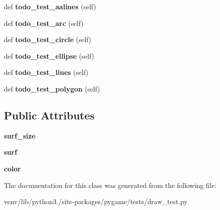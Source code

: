 \begin{DoxyCompactItemize}
def {\bfseries todo\+\_\+test\+\_\+aalines} (self)
\item 
\mbox{\label{classpygame_1_1tests_1_1draw__test_1_1_draw_module_test_af7cbd94a21cac37096e8d1f797a6cd6c}} 
def {\bfseries todo\+\_\+test\+\_\+arc} (self)
\item 
\mbox{\label{classpygame_1_1tests_1_1draw__test_1_1_draw_module_test_a458d3c5af6c649a918e0015544e554c1}} 
def {\bfseries todo\+\_\+test\+\_\+circle} (self)
\item 
\mbox{\label{classpygame_1_1tests_1_1draw__test_1_1_draw_module_test_aff520831d30c20243afeeb8144c0c46d}} 
def {\bfseries todo\+\_\+test\+\_\+ellipse} (self)
\item 
\mbox{\label{classpygame_1_1tests_1_1draw__test_1_1_draw_module_test_a0bdb0f5253850841d552da68ae03fe6d}} 
def {\bfseries todo\+\_\+test\+\_\+lines} (self)
\item 
\mbox{\label{classpygame_1_1tests_1_1draw__test_1_1_draw_module_test_ac06b792fc0a0d8b87eac52a1813aca73}} 
def {\bfseries todo\+\_\+test\+\_\+polygon} (self)
\end{DoxyCompactItemize}
\subsection*{Public Attributes}
\begin{DoxyCompactItemize}
\item 
\mbox{\label{classpygame_1_1tests_1_1draw__test_1_1_draw_module_test_aa785f7502f89ce6a2fac2041dbe8020f}} 
{\bfseries surf\+\_\+size}
\item 
\mbox{\label{classpygame_1_1tests_1_1draw__test_1_1_draw_module_test_abfade72e286ac984f4c5d4d7183b335d}} 
{\bfseries surf}
\item 
\mbox{\label{classpygame_1_1tests_1_1draw__test_1_1_draw_module_test_a87afd24810a760ece330f61496a0f6db}} 
{\bfseries color}
\end{DoxyCompactItemize}


The documentation for this class was generated from the following file\+:\begin{DoxyCompactItemize}
\item 
venv/lib/python3./site-\/packages/pygame/tests/draw\+\_\+test.\+py\end{DoxyCompactItemize}
